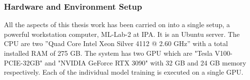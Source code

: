 \subsubsection{Hardware and Environment Setup}
\label{sec:hardware}
All the aspects of this thesis work has been carried on into a single setup, a powerful workstation computer, ML-Lab-2 at \ac{IPA}. It is an Ubuntu server. The \ac{CPU} are two ”Quad Core Intel Xeon Silver 4112 @ 2.60 GHz” with a total installed \ac{RAM} of 275 GB. The system has two \ac{GPU} which are "Tesla V100-PCIE-32GB" and "NVIDIA GeForce RTX 3090" with 32 \ac{GB} and 24 \ac{GB} memory respectively. Each of the individual model training is executed on a single GPU. 



